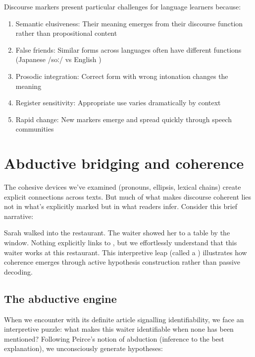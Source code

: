 Discourse markers present particular challenges for language learners because:

\begin{enumerate}[noitemsep]
   \item Semantic elusiveness: Their meaning emerges from their discourse function rather than propositional content
   \item False friends: Similar forms across languages often have different functions (Japanese  /soː/ vs English )
   \item Prosodic integration: Correct form with wrong intonation changes the meaning
   \item Register sensitivity: Appropriate use varies dramatically by context
   \item Rapid change: New markers emerge and spread quickly through speech communities
\end{enumerate}

\section{Abductive bridging and coherence}\label{sec:bridging}

The cohesive devices we've examined (pronouns, ellipsis, lexical chains) create explicit connections across texts. But much of what makes discourse coherent lies not in what's explicitly marked but in what readers infer. Consider this brief narrative:

\ea
   Sarah walked into the restaurant. The waiter showed her to a table by the window.
\z
Nothing explicitly links  to , but we effortlessly understand that this waiter works at this restaurant. This interpretive leap (called a ) illustrates how coherence emerges through active hypothesis construction rather than passive decoding.

\subsection{The abductive engine}

When we encounter  with its definite article signalling identifiability, we face an interpretive puzzle: what makes this waiter identifiable when none has been mentioned? Following Peirce's notion of abduction (inference to the best explanation), we unconsciously generate hypotheses:

